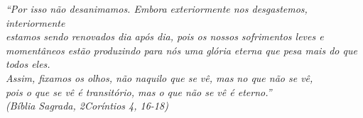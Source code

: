 \begin{epigrafe}
    \vspace*{\fill}
	\begin{flushright}

		\textit{``Por isso não desanimamos. Embora exteriormente nos desgastemos, interiormente\\
		estamos sendo renovados dia após dia, pois os nossos sofrimentos leves e momentâneos estão produzindo para nós uma glória eterna que pesa mais do que todos eles.\\
        Assim, fixamos os olhos, não naquilo que se vê, mas no que não se vê,\\
		pois o que se vê é transitório, mas o que não se vê é eterno.''\\
		(Bíblia Sagrada, 2Coríntios 4, 16-18)}
	\end{flushright}
\end{epigrafe}
